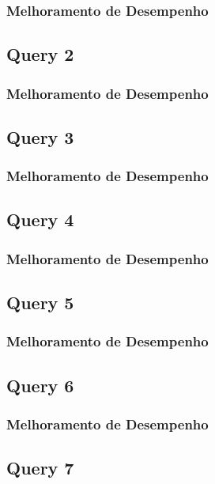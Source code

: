 \documentclass[a4paper]{article}
\begin{document}
\subsubsection{Melhoramento de Desempenho}

\subsection{Query 2}

\subsubsection{Melhoramento de Desempenho}

\subsection{Query 3}

\subsubsection{Melhoramento de Desempenho}

\subsection{Query 4}

\subsubsection{Melhoramento de Desempenho}

\subsection{Query 5}

\subsubsection{Melhoramento de Desempenho}

\subsection{Query 6}

\subsubsection{Melhoramento de Desempenho}

\subsection{Query 7}
\end{document}
